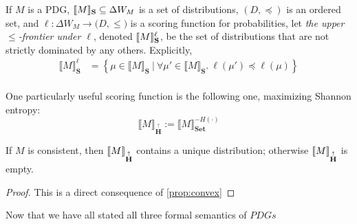 \documentclass{article}
\newcommand\Set{\textbf{Set}}
\newcommand\MaxEnt{{\overset{\uparrow}{\mathbf H}}}
\newcommand{\MN}{PDG}
\newcommand{\MNs}{\MN s}
\begin{document}
	\begin{defn}
		If  $M$ is a \MN, $\llbracket M\rrbracket_{\mathbf S} \subseteq \Delta W_{M}$ is a set of distributions, $(D, \preceq)$ is an ordered set, and $\ell : \Delta W_{M} \to \mathbb (D, \leq)$ is a scoring function for probabilities, let \emph{the upper $\leq$-frontier under $\ell$}, denoted $\llbracket M\rrbracket_{\mathbf S}^\ell$, be the set of distributions that are not strictly dominated by any others. Explicitly,
		\begin{align*}
			\llbracket M \rrbracket_{\mathbf S}^\ell &=  \left\{\mu \in \llbracket M \rrbracket_{\mathbf S} ~\Big|~ \forall \mu' \in \llbracket M \rrbracket_{\mathbf S}.~ \ell(\mu') \preceq \ell(\mu)  \right\} \\
		\end{align*}
	\end{defn}
	One particularly useful scoring function is the following one, maximizing Shannon entropy:
	\[ \Big\llbracket M \Big\rrbracket_\MaxEnt := \Big\llbracket M \Big\rrbracket_\Set^{-H(\cdot)} \]

	\begin{theorem} 
		If $M$ is consistent, then $\bbr{M}_\MaxEnt$ contains a unique distribution; otherwise $\bbr{M}_\MaxEnt$ is empty.
	\end{theorem}
	\begin{proof}
		\vspace{-1em}
		This is a direct consequence of \cref{prop:convex}
	\end{proof}


	
	
	Now that we have all stated all three formal semantics of $\MNs$

	
	
\end{document}
